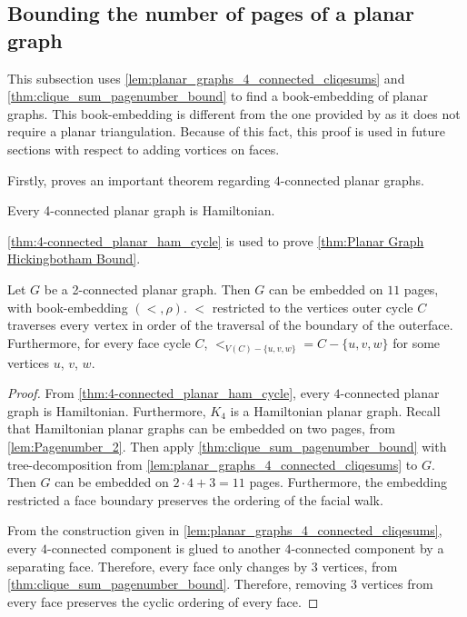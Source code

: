 \subsection{Bounding the number of pages of a planar graph}
This subsection uses \cref{lem:planar_graphs_4_connected_cliqesums} and \cref{thm:clique_sum_pagenumber_bound} to find a book-embedding of planar graphs. This book-embedding is different from the one provided by \textcite{yannakakisEmbeddingPlanarGraphs1989} as it does not require a planar triangulation. Because of this fact, this proof is used in future sections with respect to adding vortices on faces. 

Firstly, \textcite{tutteTheoremPlanarGraphs1956} proves an important theorem regarding $4$-connected planar graphs.

\begin{theorem}\label{thm:4-connected_planar_ham_cycle}
	Every 4-connected planar graph is Hamiltonian.
\end{theorem}

\cref{thm:4-connected_planar_ham_cycle} is used to prove \cref{thm:Planar Graph Hickingbotham Bound}.

\begin{corollary}\label{thm:Planar Graph Hickingbotham Bound}
	Let \(G\) be a 2-connected planar graph. Then $G$ can be embedded on $11$ pages, with book-embedding $(<, \rho)$. $<$ restricted to the vertices outer cycle $C$ traverses every vertex in order of the traversal of the boundary of the outerface. Furthermore, for every face cycle $C$, $<_{V(C) - \{u, v, w\}} = C - \{u, v, w\}$ for some vertices $u$, $v$, $w$. 
\end{corollary}
\begin{proof}
	From \cref{thm:4-connected_planar_ham_cycle}, every $4$-connected planar graph is Hamiltonian. Furthermore, $K_4$ is a Hamiltonian planar graph.
	Recall that Hamiltonian planar graphs can be embedded on two pages, from \cref{lem:Pagenumber_2}. 
	Then apply \cref{thm:clique_sum_pagenumber_bound} with tree-decomposition from \cref{lem:planar_graphs_4_connected_cliqesums} to $G$. Then $G$ can be embedded on \(2 \cdot 4 + 3 = 11\) pages. Furthermore, the embedding restricted a face boundary preserves the ordering of the facial walk.

	From the construction given in \cref{lem:planar_graphs_4_connected_cliqesums}, every $4$-connected component is glued to another $4$-connected component by a separating face. Therefore, every face only changes by $3$ vertices, from \cref{thm:clique_sum_pagenumber_bound}. Therefore, removing $3$ vertices from every face preserves the cyclic ordering of every face.
\end{proof}

